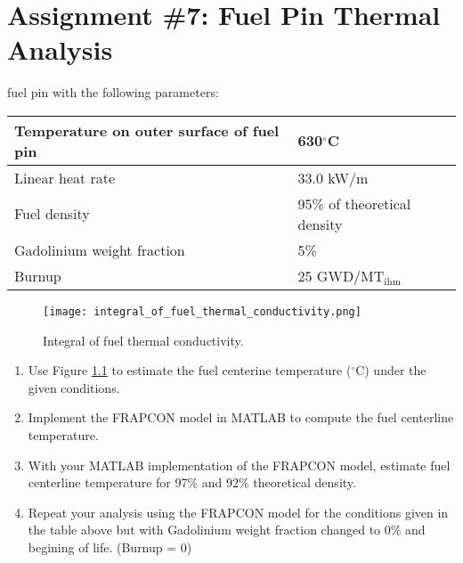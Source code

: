 \chapter{Assignment \#7: Fuel Pin Thermal Analysis}
\label{ch:ass7}


\begin{fullwidth}
 fuel pin with the following parameters:
\begin{table}
\begin{tabular}{l | l}
\toprule
Temperature on outer surface of fuel pin & 630$^{\circ}$C \\
\hline
Linear heat rate & 33.0 kW/m \\
\hline
Fuel density & 95\% of theoretical density \\
\hline
Gadolinium weight fraction & 5\% \\
\hline
Burnup & 25 GWD/MT$_{\text{ihm}}$ \\
\bottomrule
\end{tabular}
\end{table}

\begin{figure}
\texttt{[image: integral\_of\_fuel\_thermal\_conductivity.png]}
\caption{Integral of fuel thermal conductivity.}
\label{fig:integral-of-fuel-thermal-conductivity}
\end{figure}
\begin{enumerate}
\item Use Figure \ref{fig:integral-of-fuel-thermal-conductivity} to estimate the fuel centerine temperature ($^{\circ}$C) under the given conditions.

\vspace{1.0 cm}

\item Implement the FRAPCON model in MATLAB to compute the fuel centerline temperature.

\vspace{1.0 cm}

\item With your MATLAB implementation of the FRAPCON model, estimate fuel centerline temperature for 97\% and 92\% theoretical density.

\vspace{1.0 cm}

\item Repeat your analysis using the FRAPCON model for the conditions given in the table above but with Gadolinium weight fraction changed to 0\% and begining of life. (Burnup = 0)


\end{enumerate}
\end{fullwidth}
